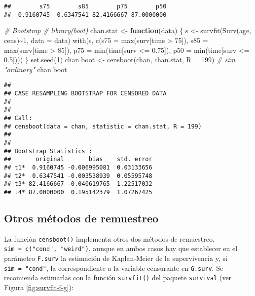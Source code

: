 \documentclass[
]{book}
\newenvironment{Shaded}{\begin{snugshade}}{\end{snugshade}}
\newcommand{\AttributeTok}[1]{\textcolor[rgb]{0.77,0.63,0.00}{#1}}
\newcommand{\CommentTok}[1]{\textcolor[rgb]{0.56,0.35,0.01}{\textit{#1}}}
\newcommand{\ControlFlowTok}[1]{\textcolor[rgb]{0.13,0.29,0.53}{\textbf{#1}}}
\newcommand{\DecValTok}[1]{\textcolor[rgb]{0.00,0.00,0.81}{#1}}
\newcommand{\FloatTok}[1]{\textcolor[rgb]{0.00,0.00,0.81}{#1}}
\newcommand{\FunctionTok}[1]{\textcolor[rgb]{0.00,0.00,0.00}{#1}}
\newcommand{\NormalTok}[1]{#1}
\newcommand{\OtherTok}[1]{\textcolor[rgb]{0.56,0.35,0.01}{#1}}
\newcommand{\SpecialCharTok}[1]{\textcolor[rgb]{0.00,0.00,0.00}{#1}}
\theoremstyle{break}
\theoremstyle{definition}
\theoremstyle{definition}
\theoremstyle{definition}
\theoremstyle{definition}
\theoremstyle{remark}
\begin{document}
\begin{verbatim}
##        s75        s85        p75        p50 
##  0.9160745  0.6347541 82.4166667 87.0000000
\end{verbatim}

\begin{Shaded}
\begin{Highlighting}[]
\CommentTok{\# Bootstrap}
\CommentTok{\# library(boot)}
\NormalTok{chan.stat }\OtherTok{\textless{}{-}} \ControlFlowTok{function}\NormalTok{(data) \{}
\NormalTok{    s }\OtherTok{\textless{}{-}} \FunctionTok{survfit}\NormalTok{(}\FunctionTok{Surv}\NormalTok{(age, cens)}\SpecialCharTok{\textasciitilde{}}\DecValTok{1}\NormalTok{, }\AttributeTok{data =}\NormalTok{ data)}
    \FunctionTok{with}\NormalTok{(s, }\FunctionTok{c}\NormalTok{(}\AttributeTok{s75 =} \FunctionTok{max}\NormalTok{(surv[time }\SpecialCharTok{\textgreater{}} \DecValTok{75}\NormalTok{]), }\AttributeTok{s85 =} \FunctionTok{max}\NormalTok{(surv[time }\SpecialCharTok{\textgreater{}} \DecValTok{85}\NormalTok{]),}
            \AttributeTok{p75 =} \FunctionTok{min}\NormalTok{(time[surv }\SpecialCharTok{\textless{}=} \FloatTok{0.75}\NormalTok{]), }\AttributeTok{p50 =} \FunctionTok{min}\NormalTok{(time[surv }\SpecialCharTok{\textless{}=} \FloatTok{0.5}\NormalTok{])))}
\NormalTok{\}}
\FunctionTok{set.seed}\NormalTok{(}\DecValTok{1}\NormalTok{)}
\NormalTok{chan.boot }\OtherTok{\textless{}{-}} \FunctionTok{censboot}\NormalTok{(chan, chan.stat, }\AttributeTok{R =} \DecValTok{199}\NormalTok{) }\CommentTok{\# sim = "ordinary"}
\NormalTok{chan.boot}
\end{Highlighting}
\end{Shaded}

\begin{verbatim}
## 
## CASE RESAMPLING BOOTSTRAP FOR CENSORED DATA
## 
## 
## Call:
## censboot(data = chan, statistic = chan.stat, R = 199)
## 
## 
## Bootstrap Statistics :
##       original       bias    std. error
## t1*  0.9160745 -0.006995081  0.03133656
## t2*  0.6347541 -0.003538939  0.05595748
## t3* 82.4166667 -0.040619765  1.22517032
## t4* 87.0000000  0.195142379  1.07267425
\end{verbatim}

\hypertarget{otros-muxe9todos-de-remuestreo}{%
\subsection{Otros métodos de remuestreo}\label{otros-muxe9todos-de-remuestreo}}

La función \texttt{censboot()} implementa otros dos métodos de remuestreo,
\texttt{sim\ =\ c("cond",\ "weird")}, aunque en ambos casos hay que establecer en el
parámetro \texttt{F.surv} la estimación de Kaplan-Meier de la supervivencia y,
si \texttt{sim\ =\ "cond"}, la correspondiente a la variable censurante en \texttt{G.surv}.
Se recomienda estimarlas con la función \texttt{survfit()} del paquete \texttt{survival}
(ver Figura \ref{fig:survfit-f-g}):
\end{document}
